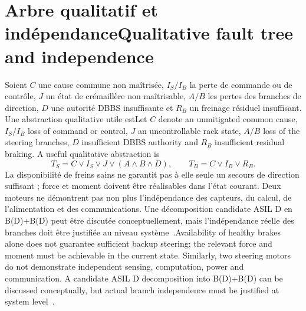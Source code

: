 \documentclass[11pt,a4paper,oneside]{report}
\newcommand{\bi}[2]{\iffrench #2\else #1\fi}
\renewcommand{\sec}[2]{\section{\bi{#1}{#2}}}
\begin{document}
\sec{Qualitative fault tree and independence}{Arbre qualitatif et indépendance}
\bi{Let $C$ denote an unmitigated common cause, $I_S/I_B$ loss of command or control, $J$ an uncontrollable rack state, $A/B$ loss of the steering branches, $D$ insufficient DBBS authority and $R_B$ insufficient residual braking. A useful qualitative abstraction is}{Soient $C$ une cause commune non maîtrisée, $I_S/I_B$ la perte de commande ou de contrôle, $J$ un état de crémaillère non maîtrisable, $A/B$ les pertes des branches de direction, $D$ une autorité DBBS insuffisante et $R_B$ un freinage résiduel insuffisant. Une abstraction qualitative utile est}
\[
T_S=C\lor I_S\lor J\lor(A\land B\land D),\qquad
T_B=C\lor I_B\lor R_B.
\]
\bi{Availability of healthy brakes alone does not guarantee sufficient backup steering; the relevant force and moment must be achievable in the current state. Similarly, two steering motors do not demonstrate independent sensing, computation, power and communication. A candidate ASIL D decomposition into B(D)+B(D) can be discussed conceptually, but actual branch independence must be justified at system level~\cite{ti}.}{La disponibilité de freins sains ne garantit pas à elle seule un secours de direction suffisant ; force et moment doivent être réalisables dans l'état courant. Deux moteurs ne démontrent pas non plus l'indépendance des capteurs, du calcul, de l'alimentation et des communications. Une décomposition candidate ASIL D en B(D)+B(D) peut être discutée conceptuellement, mais l'indépendance réelle des branches doit être justifiée au niveau système~\cite{ti}.}
\end{document}
